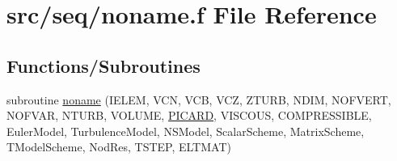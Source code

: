 \hypertarget{seq_2noname_8f}{\section{src/seq/noname.f File Reference}
\label{seq_2noname_8f}
}
\subsection*{Functions/\-Subroutines}
\begin{DoxyCompactItemize}
\item 
subroutine \hyperlink{seq_2noname_8f_a3579d52ea1a8b01374dd1bbc210ceacc}{noname} (I\-E\-L\-E\-M, V\-C\-N, V\-C\-B, V\-C\-Z, Z\-T\-U\-R\-B, N\-D\-I\-M, N\-O\-F\-V\-E\-R\-T, N\-O\-F\-V\-A\-R, N\-T\-U\-R\-B, V\-O\-L\-U\-M\-E, \hyperlink{implicit_8h_a699fe3c650f16fbb4a56d74dee7a8109}{P\-I\-C\-A\-R\-D}, V\-I\-S\-C\-O\-U\-S, C\-O\-M\-P\-R\-E\-S\-S\-I\-B\-L\-E, Euler\-Model, Turbulence\-Model, N\-S\-Model, Scalar\-Scheme, Matrix\-Scheme, T\-Model\-Scheme, Nod\-Res, T\-S\-T\-E\-P, E\-L\-T\-M\-A\-T)
\end{DoxyCompactItemize}


